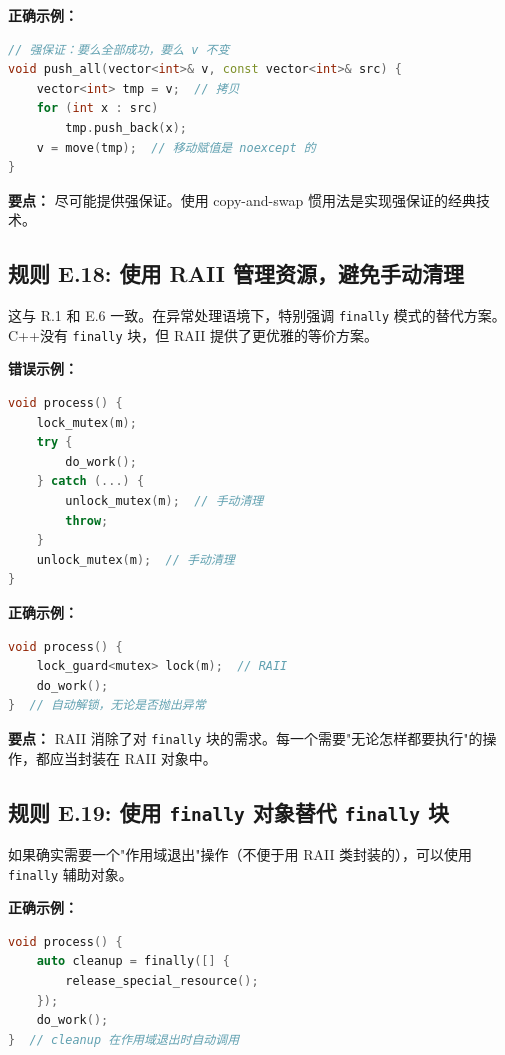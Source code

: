 \textbf{正确示例：}

\begin{lstlisting}[language=C++]
// 强保证：要么全部成功，要么 v 不变
void push_all(vector<int>& v, const vector<int>& src) {
    vector<int> tmp = v;  // 拷贝
    for (int x : src)
        tmp.push_back(x);
    v = move(tmp);  // 移动赋值是 noexcept 的
}
\end{lstlisting}

\textbf{要点：} 尽可能提供强保证。使用 copy-and-swap 惯用法是实现强保证的经典技术。

\subsection*{\textbf{规则 E.18:} 使用 RAII 管理资源，避免手动清理}

这与 R.1 和 E.6 一致。在异常处理语境下，特别强调 \texttt{finally} 模式的替代方案。C++没有 \texttt{finally} 块，但 RAII 提供了更优雅的等价方案。

\textbf{错误示例：}

\begin{lstlisting}[language=C++]
void process() {
    lock_mutex(m);
    try {
        do_work();
    } catch (...) {
        unlock_mutex(m);  // 手动清理
        throw;
    }
    unlock_mutex(m);  // 手动清理
}
\end{lstlisting}

\textbf{正确示例：}

\begin{lstlisting}[language=C++]
void process() {
    lock_guard<mutex> lock(m);  // RAII
    do_work();
}  // 自动解锁，无论是否抛出异常
\end{lstlisting}

\textbf{要点：} RAII 消除了对 \texttt{finally} 块的需求。每一个需要"无论怎样都要执行"的操作，都应当封装在 RAII 对象中。

\subsection*{\textbf{规则 E.19:} 使用 \texttt{finally} 对象替代 \texttt{finally} 块}

如果确实需要一个"作用域退出"操作（不便于用 RAII 类封装的），可以使用 \texttt{finally} 辅助对象。

\textbf{正确示例：}

\begin{lstlisting}[language=C++]
void process() {
    auto cleanup = finally([] {
        release_special_resource();
    });
    do_work();
}  // cleanup 在作用域退出时自动调用
\end{lstlisting}

